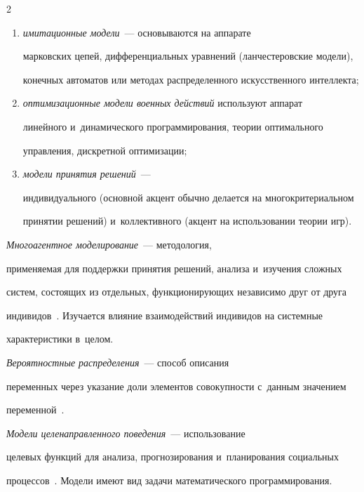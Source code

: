 \begin{multicols}{2}
\begin{enumerate}[(1)]
соответствующих динамических систем и~исследование их структурной 

устойчивости; 

\item \textit{имитационные модели}~--- основываются на аппарате 

марковских цепей, дифференциальных уравнений (ланчестеровские модели), 

конечных автоматов или методах распределенного искусственного интеллекта; 

\item \textit{оптимизационные модели военных действий} используют аппарат 

линейного и~динамического программирования, теории оптимального 

управления, дискретной оптимизации; 

\item \textit{модели принятия решений}~--- 

индивидуального (основной акцент обычно делается на многокритериальном 

принятии решений) и~коллективного (акцент на использовании теории игр). 

\end{enumerate}

  

  \textit{Многоагентное моделирование}~--- методология, 

применяемая для поддержки принятия решений, анализа и~изучения сложных 

сис\-тем, со\-сто\-ящих из отдельных, функционирующих независимо друг от друга 

индивидов~\cite{16-r}. Изучается влияние взаимодействий индивидов на сис\-тем\-ные 

характеристики в~целом.

  

  \textit{Вероятностные распределения}~--- способ описания 

переменных через указание доли элементов совокупности с~данным значением 

переменной~\cite{17-r}.

  

  \textit{Модели целенаправленного поведения}~--- использование 

целевых функций для анализа, прогнозирования и~планирования социальных 

процессов~\cite{18-r}. Модели имеют вид задачи математического программирования.


\end{multicols}
